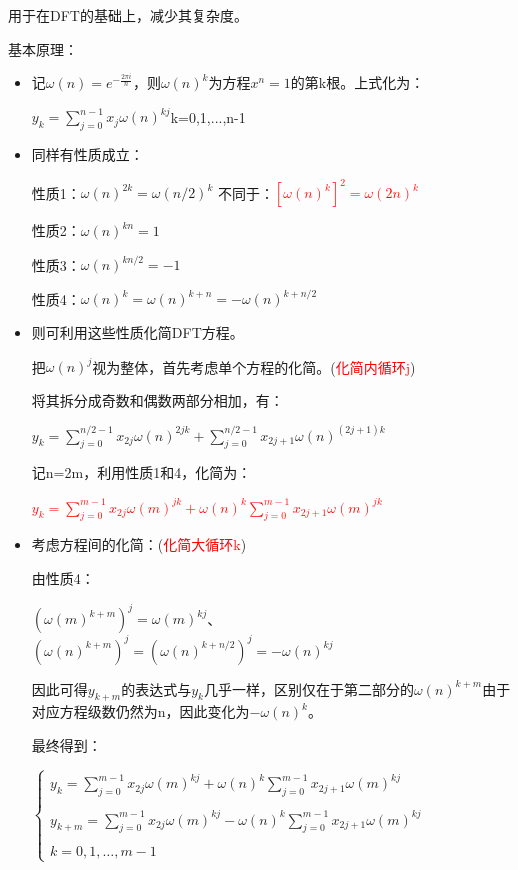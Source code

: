 \documentclass[UTF8]{article}%
\begin{document}
用于在DFT的基础上，减少其复杂度。

基本原理：

\begin{itemize}
    \item 记$\omega (n)=e^{-\frac{2 \pi i}{n}}$，则$\omega (n)^k$为方程$x^n=1$的第k根。上式化为：
    
    $y_k=\sum_{j=0}^{n-1} x_j \omega (n)^{kj}$\qquad k=0,1,...,n-1

    \item 同样有性质成立：
    
    性质1：$\omega (n)^{2k}=\omega (n/2)^k$ 不同于：\textcolor{red}{$[\omega (n)^{k}]^2=\omega (2n)^k$}

    性质2：$\omega (n)^{kn}=1$

    性质3：$\omega (n)^{kn/2}=-1$
    
    性质4：$\omega (n)^{k}=\omega (n)^{k+n}=-\omega (n)^{k+n/2}$

    \item 则可利用这些性质化简DFT方程。
    
    把$\omega (n)^{j}$视为整体，首先考虑单个方程的化简。(\textcolor{red}{化简内循环j})
    
    将其拆分成奇数和偶数两部分相加，有：

    $y_{k}=\sum_{j=0}^{n/2-1} x_{2j} \omega(n)^{2jk}+\sum_{j=0}^{n/2-1} x_{2j+1} \omega(n)^{(2j+1)k}$

    记n=2m，利用性质1和4，化简为：

    \textcolor{red}{$y_{k}=\sum_{j=0}^{m-1} x_{2j} \omega(m)^{jk}+\omega(n)^{k}\sum_{j=0}^{m-1} x_{2j+1} \omega(m)^{jk}$}
    
    \item 考虑方程间的化简：(\textcolor{red}{化简大循环k})
    
    由性质4：
    
    $(\omega (m)^{k+m})^j=\omega (m)^{kj}$、$(\omega (n)^{k+m})^j=(\omega (n)^{k+n/2})^j=-\omega (n)^{kj}$

    因此可得$y_{k+m}$的表达式与$y_k$几乎一样，区别仅在于第二部分的$\omega(n)^{k+m}$由于对应方程级数仍然为n，因此变化为$-\omega(n)^{k}$。
    
    最终得到：
    
    $\left\{\begin{array}{l}
        y_{k}=\sum_{j=0}^{m-1} x_{2 j} \omega(m)^{k j}+\omega(n)^{k} \sum_{j=0}^{m-1} x_{2 j+1} \omega(m)^{k j} \\ \\
        y_{k+m}=\sum_{j=0}^{m-1} x_{2 j} \omega(m)^{k j}-\omega(n)^{k} \sum_{j=0}^{m-1} x_{2 j+1} \omega(m)^{k j} \\ \\
        k=0,1, \ldots, m-1
    \end{array}\right.$


\end{itemize}
\end{document}
